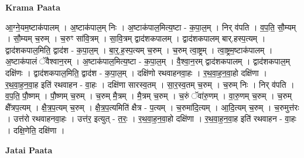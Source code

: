 \documentclass[17pt]{extarticle}
\begin{document}
\textbf{Krama Paata} \newline

आ॒ग्ने॒यम॒ष्टाक॑पालम् । अ॒ष्टाक॑पाल॒म् निः । अ॒ष्टाक॑पाल॒मित्य॒ष्टा - क॒पा॒ल॒म् । निर् व॑पति । व॒प॒ति॒ सौ॒म्यम् । सौ॒म्यम् च॒रुम् । च॒रुꣳ सा॑वि॒त्रम् । सा॒वि॒त्रम् द्वाद॑शकपालम् । द्वाद॑शकपालम् बार्.हस्प॒त्यम् । द्वाद॑शकपाल॒मिति॒ द्वाद॑श - क॒पा॒ल॒म् । बा॒र्॒.ह॒स्प॒त्यम् च॒रुम् । च॒रुम् त्वा॒ष्ट्रम् । त्वा॒ष्ट्रम॒ष्टाक॑पालम् । अ॒ष्टाक॑पालं ॅवैश्वान॒रम् । अ॒ष्टाक॑पाल॒मित्य॒ष्टा - क॒पा॒ल॒म् । वै॒श्वा॒न॒रम् द्वाद॑शकपालम् । द्वाद॑शकपाल॒म् दक्षि॑णः । द्वाद॑शकपाल॒मिति॒ द्वाद॑श - क॒पा॒ल॒म् । दक्षि॑णो रथवाहनवा॒हः । र॒थ॒वा॒ह॒न॒वा॒हो दक्षि॑णा । र॒थ॒वा॒ह॒न॒वा॒ह इति॑ रथवाहन - वा॒हः । दक्षि॑णा सारस्व॒तम् । सा॒र॒स्व॒तम् च॒रुम् । 
च॒रुम् निः । निर् व॑पति । व॒प॒ति॒ पौ॒ष्णम् । पौ॒ष्णम् च॒रुम् । च॒रुम् मै॒त्रम् । मै॒त्रम् च॒रुम् । 
च॒रुं ॅवा॑रु॒णम् । वा॒रु॒णम् च॒रुम् । च॒रुम् क्षै᳚त्रप॒त्यम् । क्षै॒त्र॒प॒त्यम् च॒रुम् । क्षै॒त्र॒प॒त्यमिति॑ क्षैत्र - प॒त्यम् । च॒रुमा॑दि॒त्यम् । आ॒दि॒त्यम् च॒रुम् । च॒रुमुत्त॑रः । उत्त॑रो रथवाहनवा॒हः । उत्त॑र॒ इत्युत् - त॒रः॒ । र॒थ॒वा॒ह॒न॒वा॒हो दक्षि॑णा । र॒थ॒वा॒ह॒न॒वा॒ह इति॑ रथवाहन - वा॒हः । दक्षि॒णेति॒ दक्षि॑णा । \newline

\textbf{Jatai Paata} \newline
\end{document}
